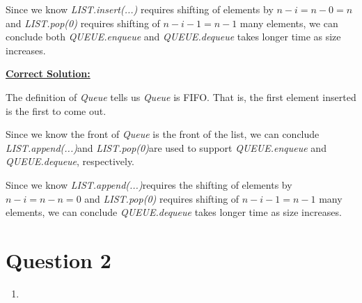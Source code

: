 \documentclass[12pt]{article}
\begin{document}
\begin{enumerate}[a.]
    \bigskip

    Since we know \textit{LIST.insert(...)} requires shifting of elements by $n - i = n - 0 = n$
    and \textit{LIST.pop(0)} requires shifting of $n - i - 1 = n - 1$ many elements,
    we can conclude both \textit{QUEUE.enqueue} and \textit{QUEUE.dequeue} takes
    longer time as size increases.

    \bigskip

    \begin{mdframed}
        \underline{\textbf{Correct Solution:}}

        The definition of \textit{Queue} tells us \textit{Queue} is FIFO. That is,
        the first element inserted is the first to come out.

        \bigskip

        Since we know the front of \textit{Queue} is the front of the list, we
        can conclude \color{red}\textit{LIST.append(...)}\color{black}\:and \color{red}\textit{LIST.pop(0)}\color{black}\:are used
        to support \textit{QUEUE.enqueue} and \textit{QUEUE.dequeue}, respectively.

        \bigskip

        Since we know \color{red}\textit{LIST.append(...)}\color{black}\:requires the shifting of elements by $n - i = n - n = 0$
        and \textit{LIST.pop(0)} requires shifting of $n - i - 1 = n - 1$ many elements,
        we can conclude \textit{QUEUE.dequeue} takes longer time as size increases.

    \end{mdframed}

\end{enumerate}

\section*{Question 2 }
\begin{enumerate}
    \item
\end{enumerate}
\end{document}
